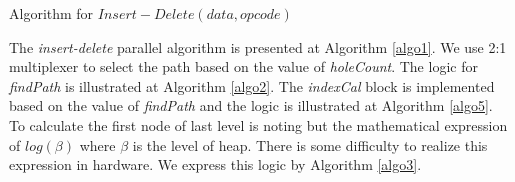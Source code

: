 \documentclass[10pt, conference, compsocconf]{IEEEtran}
\begin{document}
\begin{algorithm}
\label{algo1}
        \caption{Algorithm for $Insert-Delete (data, opcode)$}
\label{algo1}
        \begin{algorithmic}[1]
            \ENDIF
                \ELSE
                \ENDIF
            \ENDFOR
          \ELSE
            \ELSE

            \ENDIF

          \ENDWHILE
        \ENDIF

        \end{algorithmic}
\end{algorithm}

The {\it insert-delete} parallel algorithm is presented at Algorithm \ref{algo1}. We use 2:1 multiplexer to select the path based on the value of {\it holeCount}. The logic for {\it findPath} is illustrated at Algorithm \ref{algo2}. The {\it indexCal} block is implemented based on the value of {\it findPath} and the logic is illustrated at Algorithm \ref{algo5}. To calculate the first node of last level is noting but the mathematical expression of $log(\beta)$ where $\beta$ is the level of heap. There is some difficulty to realize this expression in hardware. We express this logic by Algorithm \ref{algo3}.
\end{document}
